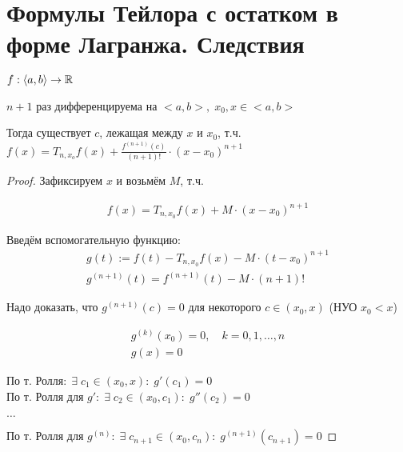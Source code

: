 \section{Формулы Тейлора с остатком в форме Лагранжа. Следствия}

\begin{theorem-non}
    $f: \langle a, b \rangle \rightarrow \mathbb{R}$

    $n + 1$ раз дифференцируема на $<a, b>, \; x_0, x \in <a, b>$

    Тогда существует $c$, лежащая между $x$ и $x_0$, т.ч.
    $f(x) = T_{n,x_o} f(x) + \frac{f^{(n+1)}(c)}{(n+1)!} \cdot (x - x_0)^{n+1}$

    \begin{proof}
        Зафиксируем $x$ и возьмём $M$, т.ч.
        
        \begin{gather*}
            f(x) = T_{n,x_0} f(x) + M \cdot (x - x_0)^{n+1}
        \end{gather*}

        Введём вспомогательную функцию:
        \begin{gather*}
            g(t) := f(t) - T_{n, x_0}f(x) - M \cdot (t - x_0)^{n+1} \\
            g^{(n+1)}(t) = f^{(n+1)}(t) - M \cdot (n + 1)!
        \end{gather*}
        
        Надо доказать, что $g^{(n+1)}(c) = 0$ для некоторого $c \in (x_0, x)$ (НУО $x_0 < x$)

        \begin{gather*}
            g^{(k)}(x_0) = 0, \quad k = 0,1, \dots, n \\
            g(x) = 0
        \end{gather*}
        
        По т. Ролля$: \; \exists \; c_1 \in (x_0, x): \; g'(c_1) = 0$ \\
        По т. Ролля для $g': \; \exists \; c_2 \in (x_0, c_1): \; g''(c_2) = 0$

        $\dots$

        По т. Ролля для $g^{(n)}: \; \exists \; c_{n+1} \in (x_0, c_n): \; g^{(n+1)}(c_{n+1}) = 0$

    \end{proof}

\end{theorem-non}

